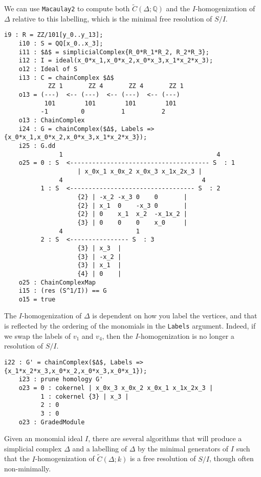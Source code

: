 \documentclass[12pt,leqno]{amsart}
\theoremstyle{definition}
\newenvironment{example}
{\pushQED{\qed}\renewcommand{\qedsymbol}{$\diamond$}\examplex}
{\popQED\endexamplex}
\begin{document}
\begin{example}
\begin{figure}[h]
\end{figure}
% 
We can use \texttt{Macaulay2} to compute both $\widetilde C(\Delta; \mathbb Q)$ and the $I$-homogenization of $\Delta$ relative to this labelling, which is the minimal free resolution of $S/I$. 
%
\begin{lstlisting}[basicstyle={\ttfamily \scriptsize}, xleftmargin=-23pt]
    i9 : R = ZZ/101[y_0..y_13];
    i10 : S = QQ[x_0..x_3];
    i11 : $Δ$ = simplicialComplex{R_0*R_1*R_2, R_2*R_3};
    i12 : I = ideal(x_0*x_1,x_0*x_2,x_0*x_3,x_1*x_2*x_3);
    o12 : Ideal of S
    i13 : C = chainComplex $Δ$
            ZZ 1       ZZ 4       ZZ 4       ZZ 1
    o13 = (---)  <-- (---)  <-- (---)  <-- (---)
           101        101        101        101
          -1         0          1          2
    o13 : ChainComplex
    i24 : G = chainComplex($Δ$, Labels => {x_0*x_1,x_0*x_2,x_0*x_3,x_1*x_2*x_3});
    i25 : G.dd
               1                                          4
    o25 = 0 : S  <-------------------------------------- S  : 1
                    | x_0x_1 x_0x_2 x_0x_3 x_1x_2x_3 |
               4                                      4
          1 : S  <---------------------------------- S  : 2
                    {2} | -x_2 -x_3 0    0       |
                    {2} | x_1  0    -x_3 0       |
                    {2} | 0    x_1  x_2  -x_1x_2 |
                    {3} | 0    0    0    x_0     |
               4                    1
          2 : S  <---------------- S  : 3
                    {3} | x_3  |
                    {3} | -x_2 |
                    {3} | x_1  |
                    {4} | 0    |
    o25 : ChainComplexMap
    i15 : (res (S^1/I)) == G
    o15 = true
\end{lstlisting}
%
The $I$-homogenization of $\Delta$ is dependent on how you label the vertices, and that is reflected by the ordering of the monomials in the \texttt{Labels} argument. Indeed, if we swap the labels of $v_1$ and $v_4$, then the $I$-homogenization is no longer a resolution of $S/I$.
%
\begin{lstlisting}[basicstyle={\ttfamily \scriptsize}, xleftmargin=-23pt]
    i22 : G' = chainComplex($Δ$, Labels => {x_1*x_2*x_3,x_0*x_2,x_0*x_3,x_0*x_1});
    i23 : prune homology G'
    o23 = 0 : cokernel | x_0x_3 x_0x_2 x_0x_1 x_1x_2x_3 |
          1 : cokernel {3} | x_3 |                       
          2 : 0                                          
          3 : 0                                          
    o23 : GradedModule
\end{lstlisting}
%
\end{example}
%
Given an monomial ideal $I$, there are several algorithms that will produce a simplicial complex $\Delta$ and a labelling of $\Delta$ by the minimal generators of $I$ such that the $I$-homogenization of $\widetilde C(\Delta; k)$ is a free resolution of $S/I$, though often non-minimally.
\end{document}
